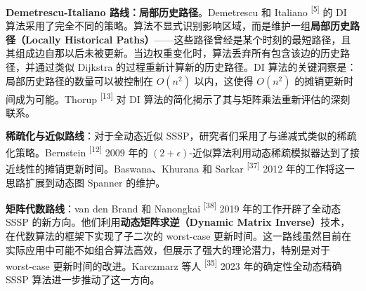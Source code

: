 \documentclass[12pt,a4paper]{ctexart}
\begin{document}
\textbf{Demetrescu-Italiano 路线：局部历史路径}。Demetrescu 和 Italiano \textsuperscript{[5]}  的 DI 算法采用了完全不同的策略。算法不显式识别影响区域，而是维护一组\textbf{局部历史路径（Locally Historical Paths）}——这些路径曾经是某个时刻的最短路径，且其组成边自那以后未被更新。当边权重变化时，算法丢弃所有包含该边的历史路径，并通过类似 Dijkstra 的过程重新计算新的历史路径。DI 算法的关键洞察是：局部历史路径的数量可以被控制在 $O(n^2)$ 以内，这使得 $O(n^2)$ 的摊销更新时间成为可能。Thorup \textsuperscript{[13]}  对 DI 算法的简化揭示了其与矩阵乘法重新评估的深刻联系。

\textbf{稀疏化与近似路线}：对于全动态近似 SSSP，研究者们采用了与递减式类似的稀疏化策略。Bernstein \textsuperscript{[12]}  2009 年的 $(2+\epsilon)$-近似算法利用动态稀疏模拟器达到了接近线性的摊销更新时间。Baswana、Khurana 和 Sarkar \textsuperscript{[37]}  2012 年的工作将这一思路扩展到动态图 Spanner 的维护。

\textbf{矩阵代数路线}：van den Brand 和 Nanongkai \textsuperscript{[38]}  2019 年的工作开辟了全动态 SSSP 的新方向。他们利用\textbf{动态矩阵求逆（Dynamic Matrix Inverse）}技术，在代数算法的框架下实现了子二次的 worst-case 更新时间。这一路线虽然目前在实际应用中可能不如组合算法高效，但展示了强大的理论潜力，特别是对于 worst-case 更新时间的改进。Karczmarz 等人 \textsuperscript{[35]}  2023 年的确定性全动态精确 SSSP 算法进一步推动了这一方向。
\end{document}
